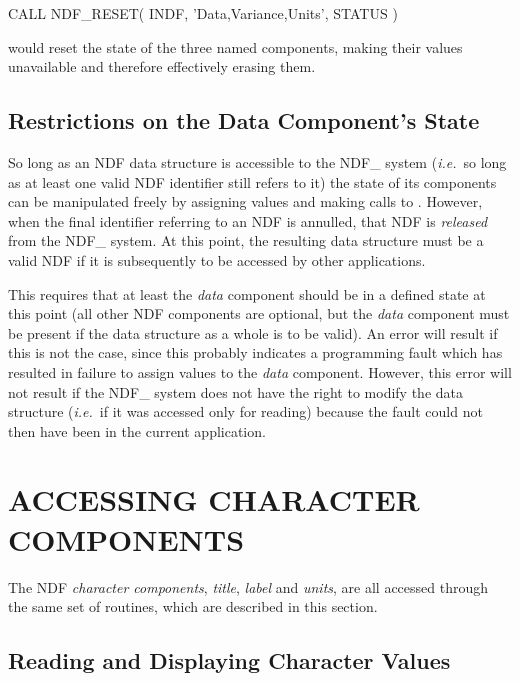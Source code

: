 \documentclass[twoside,11pt,nolof]{starlink}
\providecommand{\st}[1]{{\emph{#1}}}
\begin{document}
\small
\begin{terminalv}
      CALL NDF_RESET( INDF, 'Data,Variance,Units', STATUS )
\end{terminalv}
\normalsize

would reset the state of the three named components, making their values
unavailable and therefore effectively erasing them.

\subsection{Restrictions on the Data Component's State}

So long as an NDF data structure is accessible to the NDF\_ system
(\st{i.e.}\ so long as at least one valid NDF identifier still refers
to it) the
state of its components can be manipulated freely by assigning values and
making calls to .
However, when the final identifier referring to an NDF is annulled, that NDF
is \st{released\/} from the NDF\_ system.
At this point, the resulting data structure must be a valid NDF if it is
subsequently to be accessed by other applications.

This requires that at least the \st{data\/} component should be in a defined
state at this point (all other NDF components are optional, but the
\st{data\/} component must be present if the data structure as a whole
is to be
valid).
An error will result if this is not the case, since this probably indicates
a programming fault which has resulted in failure to assign values to
the \st{data\/} component.
However, this error will not result if the NDF\_ system does not have the
right to modify the data structure (\st{i.e.}\ if it was accessed only for
reading) because the fault could not then have been in the current application.


\section{\label{ss:accessingcharcomponents}ACCESSING CHARACTER COMPONENTS}

The NDF \st{character components}, \st{title}, \st{label\/} and \st{units},
are all accessed through the same set of routines, which are described in this
section.

\subsection{\label{ss:cmsg}Reading and Displaying Character Values}
\end{document}
